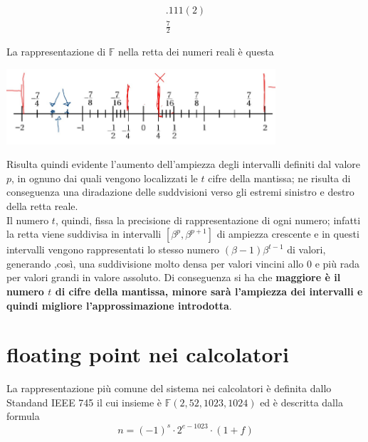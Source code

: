 {\begin{multicols}{4}
\[\begin{array}{c}
        .111(2) \\
        \frac{7}{2}
        \end{array}
        \]
    \end{multicols}
    La rappresentazione di $\mathbb{F}$ nella retta dei numeri reali è questa
    \begin{center}
      \includegraphics[width=10cm]{./img/retta_reale.png}
    \end{center}
}

Risulta quindi evidente l'aumento dell'ampiezza degli intervalli definiti dal valore $p$, in ognuno dai quali vengono localizzati le $t$ cifre della mantissa; ne risulta di conseguenza una diradazione delle suddvisioni verso gli estremi sinistro e destro della retta reale. \\
Il numero $t$, quindi, fissa la precisione di rappresentazione di ogni numero; infatti la retta viene suddivisa in intervalli $[\beta^p,\beta^{p+1}]$  di ampiezza crescente e in questi intervalli vengono rappresentati lo stesso numero $(\beta-1)\beta^{t-1}$ di valori, generando ,così, una suddivisione molto densa per valori vincini allo 0 e più rada per valori grandi in valore assoluto. Di conseguenza si ha che \textbf{maggiore è il numero $t$ di cifre della mantissa, minore sarà l'ampiezza dei intervalli e quindi migliore l'approssimazione introdotta}.

\section{floating point nei calcolatori}
La rappresentazione più comune del sistema nei calcolatori è definita dallo Standand IEEE 745 il cui insieme è $\mathbb{F}(2,52,1023,1024)$ ed è descritta dalla formula
\[
    n = (-1)^s \cdot 2^{e-1023} \cdot (1+f)   
\]


